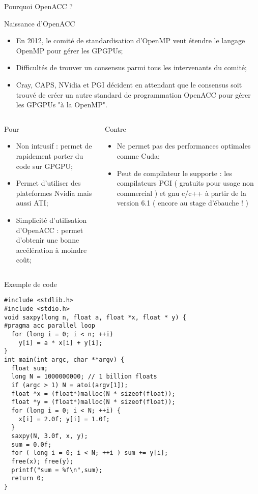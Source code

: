 \documentclass[handout,francais]{beamer}
\begin{document}
\begin{frame}[fragile]{Pourquoi OpenACC ?}
\scriptsize
\begin{block}{Naissance d'OpenACC}
\begin{itemize}
\item En 2012, le comité de standardisation d'OpenMP veut étendre le langage
OpenMP pour gérer les GPGPUs;
\item Difficultés de trouver un consensus parmi tous les intervenants du comité;
\item Cray, CAPS, NVidia et PGI décident en attendant que le consensus soit trouvé
de créer un autre standard de programmation OpenACC pour gérer les GPGPUs "à la
OpenMP".
\end{itemize}
\end{block}
\begin{columns}
\begin{column}{0.5\textwidth}
\begin{exampleblock}{Pour}
\begin{itemize}
\item Non intrusif : permet de rapidement porter du code sur GPGPU;
\item Permet d'utiliser des plateformes Nvidia mais aussi ATI;
\item Simplicité d'utilisation d'OpenACC : permet d'obtenir une bonne
accélération à moindre coût;
\end{itemize}
\end{exampleblock}
\end{column}
\begin{column}{0.5\textwidth}
\begin{alertblock}{Contre}
\begin{itemize}
\item Ne permet pas des performances optimales comme Cuda;
\item Peut de compilateur le supporte : les compilateurs PGI ( gratuits
pour usage non commercial ) et gnu c/c++ à partir de la version 6.1 ( encore
au stage d'ébauche ! )
\end{itemize}
\end{alertblock}
\end{column}
\end{columns}
\end{frame}

\begin{frame}[fragile]{Exemple de code}
\scriptsize
\begin{lstlisting}
#include <stdlib.h>
#include <stdio.h>
void saxpy(long n, float a, float *x, float * y) {
#pragma acc parallel loop
  for (long i = 0; i < n; ++i)
    y[i] = a * x[i] + y[i];
}
int main(int argc, char **argv) {
  float sum;
  long N = 1000000000; // 1 billion floats
  if (argc > 1) N = atoi(argv[1]);
  float *x = (float*)malloc(N * sizeof(float));
  float *y = (float*)malloc(N * sizeof(float));
  for (long i = 0; i < N; ++i) {
    x[i] = 2.0f; y[i] = 1.0f;
  }
  saxpy(N, 3.0f, x, y);
  sum = 0.0f;
  for ( long i = 0; i < N; ++i ) sum += y[i];
  free(x); free(y);
  printf("sum = %f\n",sum);
  return 0;
}
\end{lstlisting}
\end{frame}
\end{document}
